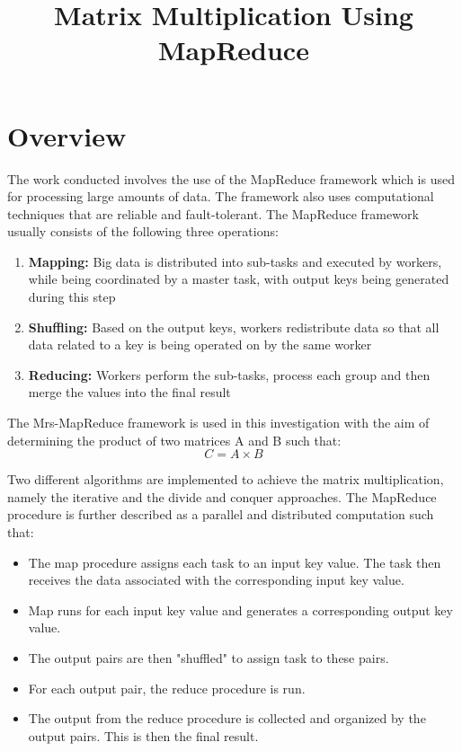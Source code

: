 \documentclass[conference]{IEEEtran}
\begin{document}
\title{Matrix Multiplication Using MapReduce}

\author{
}

\maketitle
\thispagestyle{plain}
\pagestyle{plain}

\IEEEpeerreviewmaketitle

\section{Overview}

\noindent The work conducted involves the use of the MapReduce framework which is used for processing large amounts of data. The framework also uses computational techniques that are reliable and fault-tolerant. The MapReduce framework usually consists of the following three operations:

\begin{enumerate}
\item \textbf{Mapping:} Big data is distributed into sub-tasks and executed by workers, while being coordinated by a master task, with output keys being generated during this step
\item \textbf{Shuffling:} Based on the output keys, workers redistribute data so that all data related to a key is being operated on by the same worker
\item \textbf{Reducing:} Workers perform the sub-tasks, process each group and then merge the values into the final result
\end{enumerate}
\medskip
\noindent The Mrs-MapReduce framework is used in this investigation with the aim of determining the product of two matrices A and B such that:
\[C = A \times B\] 

\noindent Two different algorithms are implemented to achieve the matrix multiplication, namely the iterative and the divide and conquer approaches. The MapReduce procedure is further described as a parallel and distributed computation such that:\\

\begin{itemize}
\item The map procedure assigns each task to an input key value. The task then receives the data associated with the corresponding input key value.
\item Map runs for each input key value and generates a corresponding output key value.
\item The output pairs are then "shuffled" to assign task to these pairs.
\item For each output pair, the reduce procedure is run.
\item The output from the reduce procedure is collected and organized by the output pairs. This is then the final result.
\end{itemize}
\end{document}
